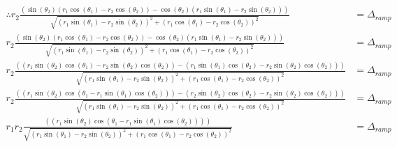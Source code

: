 \documentclass{article}
\begin{document}
	 \begin{align}
	 \therefore r_{2} \frac{\left(\sin \left({\theta_{2}}\right) \left(r_{1} \cos \left(\theta_{1}\right) - r_{2} \cos \left(\theta_{2}\right)\right) - \cos \left({\theta_{2}}\right) \left(r_{1} \sin \left(\theta_{1}\right) - r_{2} \sin \left(\theta_{2}\right)\right)\right)}{\sqrt{\left(r_{1} \sin \left(\theta_{1}\right) - r_{2} \sin \left(\theta_{2}\right)\right)^{2} + \left(r_{1} \cos \left(\theta_{1}\right) - r_{2} \cos \left(\theta_{2}\right)\right)^{2}}} &= \Delta_{ramp} \\
	 r_{2} \frac{\left(\sin \left({\theta_{2}}\right) \left(r_{1} \cos \left(\theta_{1}\right) - r_{2} \cos \left(\theta_{2}\right)\right) - \cos \left({\theta_{2}}\right) \left(r_{1} \sin \left(\theta_{1}\right) - r_{2} \sin \left(\theta_{2}\right)\right)\right)}{\sqrt{\left(r_{1} \sin \left(\theta_{1}\right) - r_{2} \sin \left(\theta_{2}\right)\right)^{2} + \left(r_{1} \cos \left(\theta_{1}\right) - r_{2} \cos \left(\theta_{2}\right)\right)^{2}}} &= \Delta_{ramp} \\
	 r_{2} \frac{\left(\left(r_{1} \sin \left({\theta_{2}}\right) \cos \left(\theta_{1}\right) - r_{2} \sin \left({\theta_{2}}\right) \cos \left(\theta_{2}\right)\right) - \left(r_{1} \sin \left(\theta_{1}\right) \cos \left({\theta_{2}}\right) - r_{2} \sin \left(\theta_{2}\right) \cos \left({\theta_{2}}\right)\right)\right)}{\sqrt{\left(r_{1} \sin \left(\theta_{1}\right) - r_{2} \sin \left(\theta_{2}\right)\right)^{2} + \left(r_{1} \cos \left(\theta_{1}\right) - r_{2} \cos \left(\theta_{2}\right)\right)^{2}}} &= \Delta_{ramp} \\
	 r_{2} \frac{\left(\left(r_{1} \sin \left({\theta_{2}}\right) \cos \left(\theta_{1} - r_{1} \sin \left(\theta_{1}\right) \cos \left({\theta_{2}}\right)\right)\right) - \left(r_{2} \sin \left({\theta_{2}}\right) \cos \left(\theta_{2}\right) - r_{2} \sin \left(\theta_{2}\right) \cos \left({\theta_{2}}\right)\right)\right)}{\sqrt{\left(r_{1} \sin \left(\theta_{1}\right) - r_{2} \sin \left(\theta_{2}\right)\right)^{2} + \left(r_{1} \cos \left(\theta_{1}\right) - r_{2} \cos \left(\theta_{2}\right)\right)^{2}}} &= \Delta_{ramp} \\
	 r_{1} r_{2} \frac{\left(\left(r_{1} \sin \left({\theta_{2}}\right) \cos \left(\theta_{1} - r_{1} \sin \left(\theta_{1}\right) \cos \left({\theta_{2}}\right)\right)\right)\right)}{\sqrt{\left(r_{1} \sin \left(\theta_{1}\right) - r_{2} \sin \left(\theta_{2}\right)\right)^{2} + \left(r_{1} \cos \left(\theta_{1}\right) - r_{2} \cos \left(\theta_{2}\right)\right)^{2}}} &= \Delta_{ramp} \\

\end{align}
\end{document}
